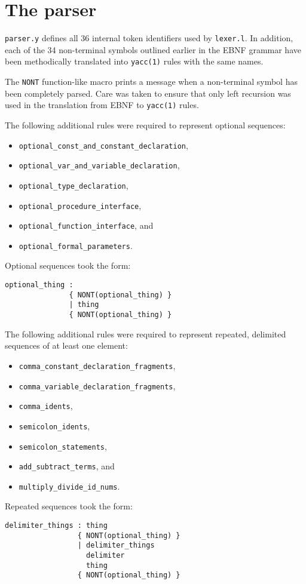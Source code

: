 \documentclass[a4paper,titlepage,12pt]{article}
\begin{document}
\newpage

\section{The parser}

\texttt{parser.y} defines all 36 internal token identifiers used by
\texttt{lexer.l}. In addition, each of the 34 non-terminal symbols
outlined earlier in the EBNF grammar have been methodically translated
into \texttt{yacc(1)} rules with the same names.

The \texttt{NONT} function-like macro prints a message when a
non-terminal symbol has been completely parsed. Care was taken to
ensure that only left recursion was used in the translation from EBNF
to \texttt{yacc(1)} rules.

The following additional rules were required to represent optional
sequences:

\begin{itemize}
	\item\texttt{optional\_const\_and\_constant\_declaration},
	\item\texttt{optional\_var\_and\_variable\_declaration},
	\item\texttt{optional\_type\_declaration},
	\item\texttt{optional\_procedure\_interface},
	\item\texttt{optional\_function\_interface}, and
	\item\texttt{optional\_formal\_parameters}.
\end{itemize}

Optional sequences took the form:

\begin{lstlisting}
optional_thing :
               { NONT(optional_thing) }
               | thing
               { NONT(optional_thing) }
\end{lstlisting}

The following additional rules were required to represent repeated,
delimited sequences of at least one element:

\begin{itemize}
	\item\texttt{comma\_constant\_declaration\_fragments},
	\item\texttt{comma\_variable\_declaration\_fragments},
	\item\texttt{comma\_idents},
	\item\texttt{semicolon\_idents},
	\item\texttt{semicolon\_statements},
	\item\texttt{add\_subtract\_terms}, and
	\item\texttt{multiply\_divide\_id\_nums}.
\end{itemize}

Repeated sequences took the form:

\begin{lstlisting}
delimiter_things : thing
                 { NONT(optional_thing) }
                 | delimiter_things
                   delimiter
                   thing
                 { NONT(optional_thing) }
\end{lstlisting}
\end{document}
